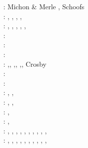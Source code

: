 \begin{scriptsize}
\twothousand: Michon \& Merle \cite{mime00}, Schoofs \etal \cite{scth00}\\
\twothousandone: \cite{hupc01}, \cite{hupc01b},
                 \cite{frbr01}, \cite{frnb01a}, \cite{frnb01b}\\
\twothousandtwo: \cite{hube02}, \cite{hani02}
                 \cite{dabm02}, \cite{vacl02}
                 \cite{belz02}, \cite{hupc02}
                 \cite{hube02b}, \cite{vacl02},
                 \cite{labu02}\\
\twothousandthree: \cite{hube03}\cite{hani03}\cite{covb03}\cite{wibm03}\\
\twothousandfour: \cite{hier04}\cite{sees04}\\
\twothousandfive: \cite{hubb05}\cite{coub05}\cite{vanw05}\cite{vabl05}\\
\twothousandsix: \cite{tibs06},\cite{coma06},
                 \cite{crwy06},\cite{peso06},
                 \cite{lemm06},\cite{malm06}, 
                 Crosby \etal \cite{crms06}\\
\twothousandseven: \cite{huha07}\cite{macl07}
                   \cite{vabl07}\cite{dyrm07}
                   \cite{hube07}\cite{buto07}
                   \cite{socb07}\cite{werr07}\\
\twothousandeight: \cite{cort08}\cite{gumb08}
                   \cite{buhb08}\cite{hube08}
                   \cite{peso08}\cite{rerw08}
                   \cite{codh08}\\
\twothousandnine: \cite{agcz09}, \cite{kekj09},
                  \cite{sihb09}\\
\twothousandten: \cite{aubh10}, \cite{gery10}
                 \cite{fosr10}, \cite{gerya2010}\\
\twothousandeleven: \cite{alht11}, \cite{ellw11}
                    \cite{hube11}\\
\twothousandtwelve: \cite{alht12}, \cite{brps12}
                    \cite{bein12}\\
\twothousandthirteen: \cite{alhf13}, \cite{brau13},
                      \cite{chbe13}, \cite{knak13},
                      \cite{kern13}, \cite{mipf13},
                      \cite{wabd13}, \cite{gery13},
                      \cite{ligw13}, \cite{gery13c},
                      \cite{ebvk13}\\
\twothousandfourteen: \cite{hebr14}, \cite{lige14},
                      \cite{brun14}, \cite{kobf14},
                      \cite{ebva14}, \cite{puge14},
                      \cite{lige14b}, \cite{hube14},
                      \cite{gogu14}, \cite{ebva14},

\end{scriptsize}
